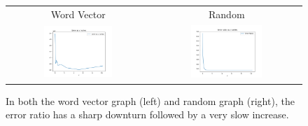 \documentclass[
]{article}
\begin{document}
\begin{figure}[!htb]
  \begin{tabular}{cc}
    Word Vector & Random                                                      \\
    \includegraphics[width=0.5\textwidth]{images/error_ratio_as_c_varies_word_vector.png}
                &
    \includegraphics[width=0.5\textwidth]{images/error_ratio_as_c_varies.png} \\
  \end{tabular}
  \caption{\label{fig:error-ratio-c-varies}
    In both the word vector graph (left) and random graph (right), the error
    ratio has a sharp downturn followed by a very slow increase.}
\end{figure}
\end{document}
